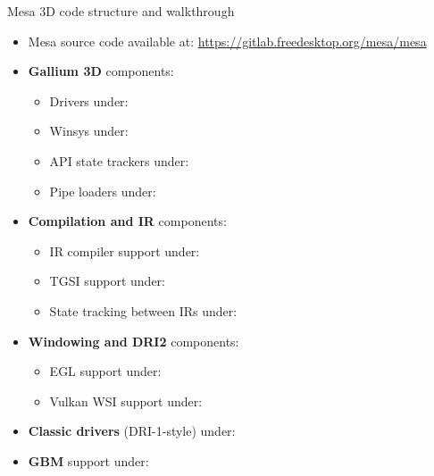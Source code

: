 \begin{frame}{Mesa 3D code structure and walkthrough}
  \begin{itemize}
  \item Mesa source code available at: \url{https://gitlab.freedesktop.org/mesa/mesa}
  \item \textbf{Gallium 3D} components:
    \begin{itemize}
    \item Drivers under: 
    \item Winsys under: 
    \item API state trackers under: 
    \item Pipe loaders under: 
    \end{itemize}
  \item \textbf{Compilation and IR} components:
    \begin{itemize}
    \item IR compiler support under: 
    \item TGSI support under: 
    \item State tracking between IRs under: 
    \end{itemize}
  \item \textbf{Windowing and DRI2} components:
    \begin{itemize}
    \item EGL support under: 
    \item Vulkan WSI support under: 
    \end{itemize}
  \item \textbf{Classic drivers} (DRI-1-style) under: 
  \item \textbf{GBM} support under: 
  \end{itemize}
\end{frame}

